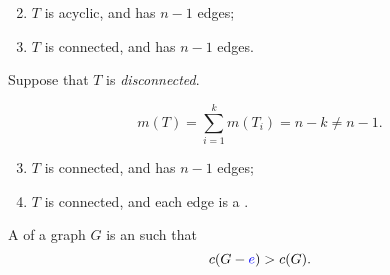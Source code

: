 \begin{frame}{}
  \begin{theorem}
    \begin{enumerate}[(1)]
        \setcounter{enumi}{1}
        \setlength{\itemsep}{6pt}
        \item $T$ is acyclic, and has $n-1$ edges;
        \item $T$ is connected, and has $n-1$ edges.
    \end{enumerate}
  \end{theorem}

  \pause
  \vspace{0.30cm}
  \begin{center}

    \pause
    \vspace{0.30cm}
    Suppose that $T$ is {\it disconnected}.

    \pause
    \vspace{0.30cm}

    \pause
    \vspace{0.30cm}

    \pause
    \[
      m(T) = \sum_{i=1}^{k} m(T_{i}) = n - k \neq n - 1.
    \]
  \end{center}
\end{frame}

\begin{frame}{}
  \begin{theorem}
    \begin{enumerate}[(1)]
      \setcounter{enumi}{2}
      \setlength{\itemsep}{6pt}
      \item $T$ is connected, and has $n-1$ edges;
      \item $T$ is connected, and each edge is a .
    \end{enumerate}
  \end{theorem}

  \pause

  \begin{definition}[Bridge (桥)]
    A  of a graph $G$ is an  such that
    \[
      c(G - \textcolor{blue}{e}) > c(G).
    \]
  \end{definition}
\end{frame}

